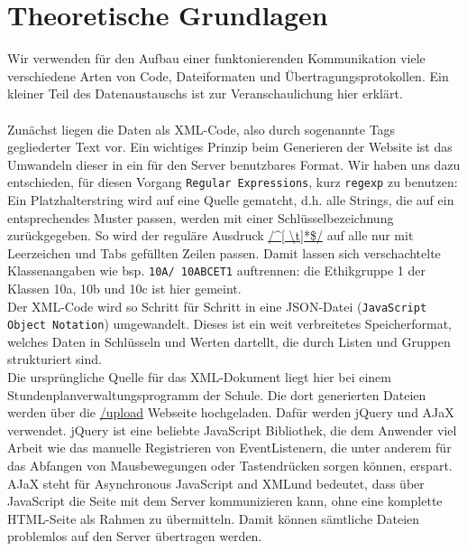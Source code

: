 \chapter{Theoretische Grundlagen}
Wir verwenden für den Aufbau einer funktonierenden Kommunikation viele verschiedene Arten von Code, Dateiformaten und Übertragungsprotokollen. Ein kleiner Teil des Datenaustauschs ist zur Veranschaulichung hier erklärt.\\\\



Zunächst liegen die Daten als XML-Code, also durch sogenannte Tags gegliederter Text vor. Ein wichtiges Prinzip beim Generieren der Website ist das Umwandeln dieser in ein für den Server benutzbares Format. Wir haben uns dazu entschieden, für diesen Vorgang \texttt{Regular Expressions}, kurz \texttt{regexp} zu benutzen: Ein Platzhalterstring wird auf eine Quelle \glqq gematcht\grqq , d.h. alle Strings, die auf ein entsprechendes Muster passen, werden mit einer Schlüsselbezeichnung zurückgegeben. So wird der reguläre Ausdruck \url{/^[ \t]*\$/} auf alle nur mit Leerzeichen und Tabs gefüllten Zeilen passen. Damit lassen sich verschachtelte Klassenangaben wie bsp. \texttt{10A/ 10ABCET1} auftrennen: die Ethikgruppe 1 der Klassen 10a, 10b und 10c ist hier gemeint.\\

Der XML-Code wird so Schritt für Schritt in eine JSON-Datei (\texttt{JavaScript Object Notation}) umgewandelt. Dieses ist ein weit verbreitetes Speicherformat, welches Daten in Schlüsseln und Werten dartellt, die durch Listen und Gruppen strukturiert sind.\\

Die ursprüngliche Quelle für das XML-Dokument liegt hier bei einem Stundenplanverwaltungsprogramm der Schule. Die dort generierten Dateien werden über die \url{/upload} Webseite hochgeladen. Dafür werden jQuery und AJaX verwendet. jQuery ist eine beliebte JavaScript Bibliothek, die dem Anwender viel Arbeit wie das manuelle Registrieren von EventListenern, die unter anderem für das Abfangen von Mausbewegungen oder Tastendrücken sorgen können, erspart. AJaX steht für \glqq Asynchronous JavaScript and XML\grqq und bedeutet, dass über JavaScript die Seite mit dem Server kommunizieren kann, ohne eine komplette HTML-Seite als Rahmen zu übermitteln. Damit können sämtliche Dateien problemlos auf den Server übertragen werden.\\

